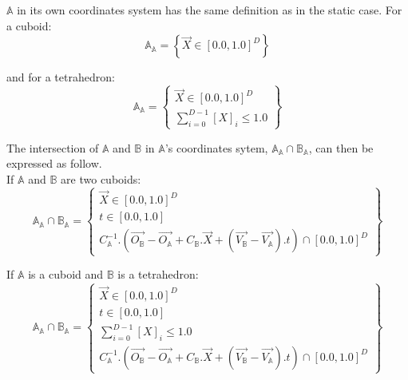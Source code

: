 \documentclass[12pt, a4paper]{article}
\begin{document}
$\mathbb{A}$ in its own coordinates system has the same definition as in the static case. For a cuboid:
\begin{equation}
\mathbb{A}_\mathbb{A}=\left\lbrace\overrightarrow{X}\in[0.0,1.0]^D\right\rbrace
\end{equation}

and for a tetrahedron:
\begin{equation}
\mathbb{A}_\mathbb{A}=\left\lbrace
\begin{array}{c}
\overrightarrow{X}\in[0.0,1.0]^D\\
\sum_{i=0}^{D-1}\left[X\right]_i\le1.0\end{array}
\right\rbrace
\end{equation}

The intersection of $\mathbb{A}$ and $\mathbb{B}$ in $\mathbb{A}$'s coordinates sytem, $\mathbb{A}_\mathbb{A}\cap\mathbb{B}_\mathbb{A}$, can then be expressed as follow.\\

If $\mathbb{A}$ and $\mathbb{B}$ are two cuboids:
\begin{equation}
\mathbb{A}_\mathbb{A}\cap\mathbb{B}_\mathbb{A}=\left\lbrace
\begin{array}{c}
\overrightarrow{X}\in[0.0,1.0]^D\\
t\in[0.0,1.0]\\
C_\mathbb{A}^{-1}.\left(\overrightarrow{O_\mathbb{B}}-\overrightarrow{O_\mathbb{A}}+C_\mathbb{B}.\overrightarrow{X}+\left(\overrightarrow{V_\mathbb{B}}-\overrightarrow{V_\mathbb{A}}\right).t\right)\cap[0.0,1.0]^D
\end{array}
\right\rbrace
\end{equation}

If $\mathbb{A}$ is a cuboid and $\mathbb{B}$ is a tetrahedron:
\begin{equation}
\mathbb{A}_\mathbb{A}\cap\mathbb{B}_\mathbb{A}=\left\lbrace
\begin{array}{c}
\overrightarrow{X}\in[0.0,1.0]^D\\
t\in[0.0,1.0]\\
\sum_{i=0}^{D-1}\left[X\right]_i\le1.0\\
C_\mathbb{A}^{-1}.\left(\overrightarrow{O_\mathbb{B}}-\overrightarrow{O_\mathbb{A}}+C_\mathbb{B}.\overrightarrow{X}+\left(\overrightarrow{V_\mathbb{B}}-\overrightarrow{V_\mathbb{A}}\right).t\right)\cap[0.0,1.0]^D
\end{array}
\right\rbrace
\end{equation}
\end{document}
